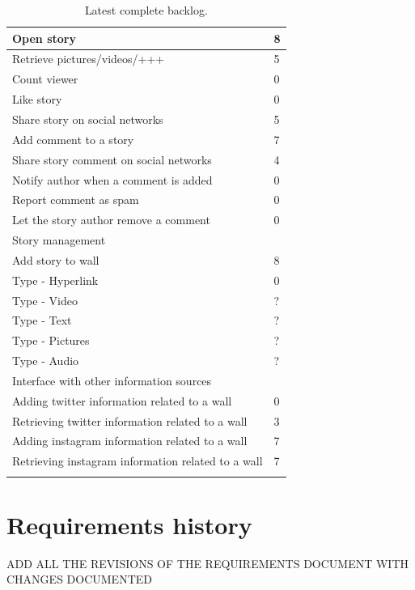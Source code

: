\documentclass[11pt]{book}
\begin{document}
\begin{center}
\begin{longtable}{| l | l |}
        \hline
        Open story & 8\\
        \hline
        Retrieve pictures/videos/+++ & 5\\
        \hline
        Count viewer & 0\\
        \hline
        Like story & 0\\
        \hline
        Share story on social networks & 5\\
        \hline
        Add comment to a story & 7\\
        \hline
        Share story comment on social networks & 4\\
        \hline
        Notify author when a comment is added     & 0\\
        \hline
        Report comment as spam & 0\\
        \hline
        Let the story author remove a comment     & 0\\
        \hline
        Story management & \\
        \hline
        Add story to wall & 8\\
        \hline
        Type - Hyperlink & 0\\
        \hline
        Type - Video & ?\\
        \hline
        Type - Text & ?\\
        \hline
        Type - Pictures & ?\\
        \hline
        Type - Audio & ?\\
        \hline
        Interface with other information sources & \\
        \hline
        Adding twitter information related to a wall & 0\\
        \hline
        Retrieving twitter information related to a wall    & 3\\
        \hline
        Adding instagram information related to a wall & 7\\
        \hline
        Retrieving instagram information related to a wall & 7\\
        \hline
        \caption{Latest complete backlog.}\label{tab:appendix_backlog}
    \end{longtable}
\end{center}

\chapter{Requirements history}\label{chap:req_history}
ADD ALL THE REVISIONS OF THE REQUIREMENTS DOCUMENT WITH CHANGES DOCUMENTED
\end{document}
